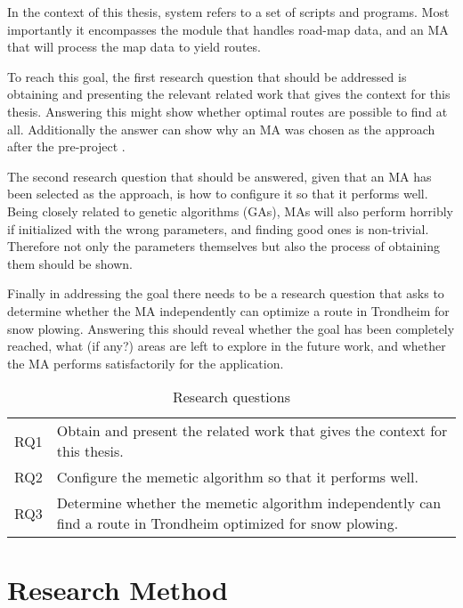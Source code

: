 In the context of this thesis, system refers to a set of scripts and programs. Most importantly it encompasses the module that handles road-map data, and an MA that will process the map data to yield routes.

To reach this goal, the first research question that should be addressed is obtaining and presenting the relevant related work that gives the context for this thesis. Answering this might show whether optimal routes are possible to find at all. Additionally the answer can show why an MA was chosen as the approach after the pre-project \citep{forprosjektet}.

The second research question that should be answered, given that an MA has been selected as the approach, is how to configure it so that it performs well. Being closely related to genetic algorithms (GAs), MAs will also perform horribly if initialized with the wrong parameters, and finding good ones is non-trivial. Therefore not only the parameters themselves but also the process of obtaining them should be shown.

Finally in addressing the goal there needs to be a research question that asks to determine whether the MA independently can optimize a route in Trondheim for snow plowing. Answering this should reveal whether the goal has been completely reached, what (if any?) areas are left to explore in the future work, and whether the MA performs satisfactorily for the application.

\begin{table}[H]
\centering
\begin{tabular}{cp{}}
RQ1  &  Obtain and present the related work that gives the context for this thesis. \\
RQ2  &  Configure the memetic algorithm so that it performs well.\\
RQ3  &  Determine whether the memetic algorithm independently can find a route in Trondheim optimized for snow plowing. \\
\end{tabular}
\caption{Research questions}
\label{tab:research_questions}
\end{table}

\section{Research Method}

